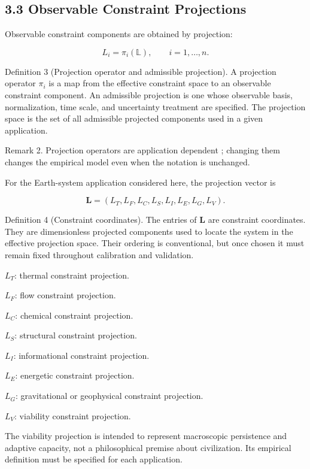 \documentclass[aps,pre,reprint,superscriptaddress,nofootinbib]{revtex4-2}
\begin{document}
\subsection{3.3 Observable Constraint Projections}

Observable constraint components are obtained by projection:

\[ L_i=\pi_i(\mathbb{L}), \qquad i=1,\ldots,n. \]

Definition 3 (Projection operator and admissible projection). A projection operator \(\pi_i\) is a map from the effective constraint space to an observable constraint component. An admissible projection is one whose observable basis, normalization, time scale, and uncertainty treatment are specified. The projection space is the set of all admissible projected components used in a given application.

Remark 2. Projection operators are application dependent \cite{Kalman1960,Koopman1931,Jolliffe2002PCA}; changing them changes the empirical model even when the notation is unchanged.

For the Earth-system application considered here, the projection vector is

\[ \mathbf{L}=(L_T,L_F,L_C,L_S,L_I,L_E,L_G,L_V). \]

Definition 4 (Constraint coordinates). The entries of \(\mathbf{L}\) are constraint coordinates. They are dimensionless projected components used to locate the system in the effective projection space. Their ordering is conventional, but once chosen it must remain fixed throughout calibration and validation.

\(L_T\): thermal constraint projection.

\(L_F\): flow constraint projection.

\(L_C\): chemical constraint projection.

\(L_S\): structural constraint projection.

\(L_I\): informational constraint projection.

\(L_E\): energetic constraint projection.

\(L_G\): gravitational or geophysical constraint projection.

\(L_V\): viability constraint projection.

The viability projection is intended to represent macroscopic persistence and adaptive capacity, not a philosophical premise about civilization. Its empirical definition must be specified for each application.
\end{document}
